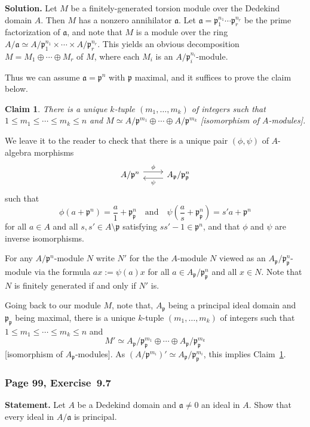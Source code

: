 \documentclass[12pt,letterpaper]{article}%
\newcommand{\mf}{\mathfrak}
\newcommand{\aaa}{\mf a}
\newcommand{\ppp}{\mf p}
\newcommand{\nn}{\noindent}
\newtheorem{claim}[thm]{Claim}
\begin{document}
\nn\textbf{Solution.} Let $M$ be a finitely-generated torsion module over the Dedekind domain $A$. Then $M$ has a nonzero annihilator $\aaa$. Let $\aaa=\ppp_1^{n_1}\cdots\ppp_r^{n_r}$ be the prime factorization of $\aaa$, and note that $M$ is a module over the ring $A/\aaa\simeq A/\ppp_1^{n_1}\times\cdots\times A/\ppp_r^{n_r}$. This yields an obvious decomposition $M=M_1\oplus\cdots\oplus M_r$ of $M$, where each $M_i$ is an $A/\ppp_i^{n_i}$-module. 

Thus we can assume $\aaa=\ppp^n$ with $\ppp$ maximal, and it suffices to prove the claim below. 
\begin{claim}\label{ktuple}
There is a unique $k$-tuple $(m_1,\dots,m_k)$ of integers such that $1\le m_1\le\cdots\le m_k\le n$ and $M\simeq A/\ppp^{m_1}\oplus\cdots\oplus A/\ppp^{m_k}$ [isomorphism of $A$-modules]. 
\end{claim}

We leave it to the reader to check that there is a unique pair $(\phi,\psi)$ of $A$-algebra morphisms 
$$
\begin{tikzcd}
A/\ppp^n\ar[r,yshift=0.9ex,"\phi"]&A_\ppp/\ppp_\ppp^n\ar[l,yshift=-0.9ex,"\psi"]
\end{tikzcd}
$$ 
such that 
$$
\phi(a+\ppp^n)=\frac a1+\ppp_\ppp^n\quad\text{and}\quad\psi\left(\frac as+\ppp_\ppp^n\right)=s'a+\ppp^n
$$ 
for all $a\in A$ and all $s,s'\in A\setminus\ppp$ satisfying $ss'-1\in\ppp^n$, and that $\phi$ and $\psi$ are inverse isomorphisms. 

For any $A/\ppp^n$-module $N$ write $N'$ for the the $A$-module $N$ viewed as an $A_\ppp/\ppp_\ppp^n$-module via the formula $ax:=\psi(a)x$ for all $a\in A_\ppp/\ppp_\ppp^n$ and all $x\in N$. Note that $N$ is finitely generated if and only if $N'$ is.  

Going back to our module $M$, note that, $A_\ppp$ being a principal ideal domain and $\ppp_\ppp$ being maximal, there is a unique $k$-tuple $(m_1,\dots,m_k)$ of integers such that 
$
1\le m_1\le\cdots\le m_k\le n
$ 
and 
$$
M'\simeq A_\ppp/\ppp_\ppp^{m_1}\oplus\cdots\oplus A_\ppp/\ppp_\ppp^{m_k}
$$ 
[isomorphism of $A_\ppp$-modules]. As $(A/\ppp^{m_i})'\simeq A_\ppp/\ppp_\ppp^{m_i}$, this implies Claim~\ref{ktuple}. 

\subsubsection{Page 99, Exercise~9.7}%

\textbf{Statement.} Let $A$ be a Dedekind domain and $\aaa\ne0$ an ideal in $A$. Show that every ideal in $A/\aaa$ is principal.
\end{document}
